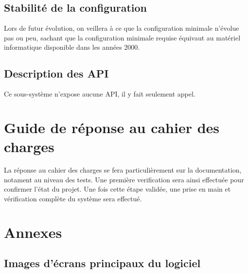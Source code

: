 \subsection{Stabilité de la configuration}
Lors de futur évolution, on veillera à ce que la configuration minimale n'évolue pas ou peu, sachant que la configuration minimale requise équivaut au matériel informatique disponible dans les années 2000.

\subsection{Description des API}
Ce sous-système n'expose aucune API, il y fait seulement appel.

\section{Guide de réponse au cahier des charges}
La réponse au cahier des charges se fera particulièrement sur la documentation, notament au niveau des tests. Une première verification sera ainsi effectuée pour confirmer l'état du projet. Une fois cette étape validée, une prise en main et vérification complète du système sera effectué.

\section{Annexes}

\subsection{Images d'écrans principaux du logiciel}

